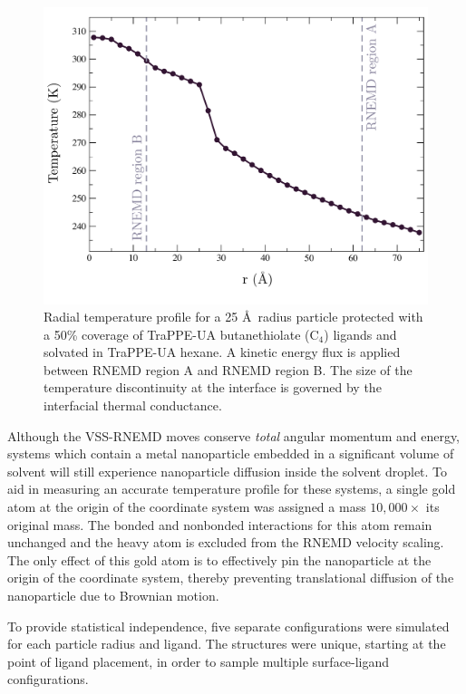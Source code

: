\documentclass[aps,jcp,preprint,showpacs,superscriptaddress,groupedaddress]{revtex4-1}  %
\begin{document}
\begin{figure}
	\includegraphics[width=\linewidth]{figures/temp_profile}
	\caption{Radial temperature profile for a 25 \AA\ radius
          particle protected with a 50\% coverage of TraPPE-UA
          butanethiolate (C$_4$) ligands and solvated in TraPPE-UA
          hexane. A kinetic energy flux is applied between RNEMD
          region A and RNEMD region B. The size of the temperature
          discontinuity at the interface is governed by the
          interfacial thermal conductance.}
	\label{fig:temp_profile}
\end{figure}

Although the VSS-RNEMD moves conserve \emph{total} angular momentum
and energy, systems which contain a metal nanoparticle embedded in a
significant volume of solvent will still experience nanoparticle
diffusion inside the solvent droplet. To aid in measuring an accurate
temperature profile for these systems, a single gold atom at the
origin of the coordinate system was assigned a mass $10,000 \times$
its original mass. The bonded and nonbonded interactions for this atom
remain unchanged and the heavy atom is excluded from the RNEMD
velocity scaling.  The only effect of this gold atom is to effectively
pin the nanoparticle at the origin of the coordinate system, thereby
preventing translational diffusion of the nanoparticle due to Brownian
motion.

To provide statistical independence, five separate configurations were
simulated for each particle radius and ligand. The structures were
unique, starting at the point of ligand placement, in order to sample
multiple surface-ligand configurations.
\end{document}
